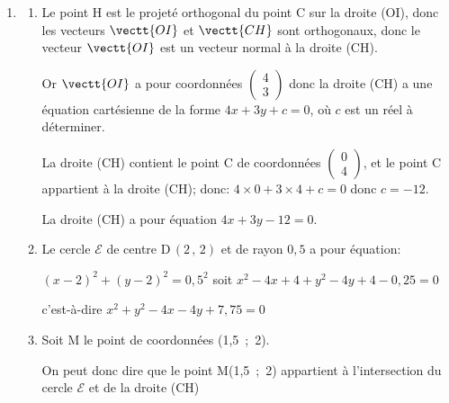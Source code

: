 \begin{enumerate}
\begin{enumerate}
On en déduit que $\text{OH}\times 5=12$ donc que $\text{OH} = \dfrac{12}{5}=2,4$.

	\end{enumerate}
\item
	\begin{enumerate}
		\item %
Le point H est le projeté orthogonal du point C sur la droite (OI), donc les vecteurs $\vectt{OI}$ et $\vectt{CH}$ sont orthogonaux, donc le vecteur $\vectt{OI}$ est un vecteur normal à la droite (CH).

Or $\vectt{OI}$ a pour coordonnées $\begin{pmatrix} 4\\3 \end{pmatrix}$ donc la droite (CH) a une équation cartésienne de la forme $4x+3y+c=0$, où $c$ est un réel à déterminer.

La droite (CH) contient le point C de coordonnées $\begin{pmatrix} 0\\4 \end{pmatrix}$, et le point C appartient à la droite (CH); donc:
$4\times 0 + 3 \times 4 + c=0$ donc $c=-12$.

La droite (CH) a pour équation $4x+3y-12=0$.

		\item %
Le cercle $\mathcal{E}$ de centre D\,$(2\,,\,2)$ et de rayon $0,5$ a pour équation:

$(x-2)^2+(y-2)^2=0,5^2$ soit $x^2-4x+4+y^2-4y+4-0,25=0$

c'est-à-dire $x^2+y^2-4x-4y +7,75=0$

		\item Soit M le point de coordonnées (1,5~;~2).

	
On peut donc dire que le point M(1,5~;~2) appartient à l'intersection du cercle $\mathcal{E}$ et de la droite (CH)	

	\end{enumerate}


\end{enumerate}

\bigskip

